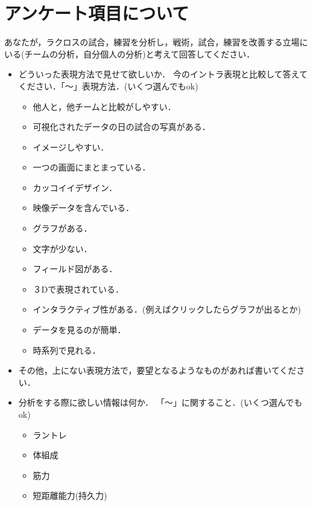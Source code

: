 \documentclass[sotsuron]{kuee}
\begin{document}





\appendix
\chapter{アンケート項目について}
	あなたが，ラクロスの試合，練習を分析し，戦術，試合，練習を改善する立場にいる(チームの分析，自分個人の分析)と考えて回答してください．
	\begin{itemize}
		\item どういった表現方法で見せて欲しいか．
			今のイントラ表現と比較して答えてください．「〜」表現方法．(いくつ選んでもok)
			\begin{itemize}
				\item 他人と，他チームと比較がしやすい．
				\item 可視化されたデータの日の試合の写真がある．
				\item イメージしやすい．
				\item 一つの画面にまとまっている．
				\item カッコイイデザイン．
				\item 映像データを含んでいる．
				\item グラフがある．
				\item 文字が少ない．
				\item フィールド図がある．
				\item ３Dで表現されている．
				\item インタラクティブ性がある．(例えばクリックしたらグラフが出るとか)
				\item データを見るのが簡単．
				\item 時系列で見れる．
			\end{itemize}
		\item その他，上にない表現方法で，要望となるようなものがあれば書いてください．
		\item 分析をする際に欲しい情報は何か．
			「〜」に関すること．(いくつ選んでもok)
			\begin{itemize}
				\item ラントレ
				\item 体組成
				\item 筋力
				\item 短距離能力(持久力)

\end{itemize}
\end{itemize}
\end{document}
